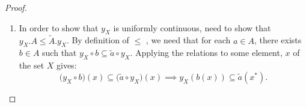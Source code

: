 \documentclass[a4paper]{article}
\theoremstyle{definition}
\begin{document}
\begin{proof}\setcounter{equation}{0}

\item \begin{enumerate}[label=(\alph*)]
	\item In order to show that $y_X^{}$ is uniformly continuous, need to show that
		$y_X^{}.A \leq \tilde{A}.y_X^{} $.
		By definition of $\leq$ , we need that for each $a\in A$, there exists $b \in A$
		such that $y_X \circ b \subseteq \tilde{a} \circ y_X$. Applying the relations
		to some element, $x$ of the set $X$ gives:
		\begin{equation} \big(y_X \circ b\big)(x) \subseteq \big( \tilde{a} \circ y_X\big)(x) \implies
		y_X(b(x)) \subseteq \tilde{a}(x^*). \end{equation}


\end{enumerate}
\end{proof}
\end{document}
